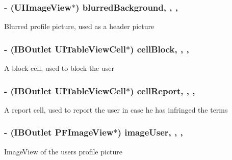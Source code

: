\subsubsection[{blurred\+Background}]{\setlength{\rightskip}{0pt plus 5cm}-\/ (U\+I\+Image\+View$\ast$) blurred\+Background\hspace{0.3cm}{\ttfamily [read]}, {\ttfamily [write]}, {\ttfamily [nonatomic]}, {\ttfamily [strong]}}\label{category_e_s_profile_view_07_08_ac1c297b924aa4ac3c198eced3b75208b}
Blurred profile picture, used as a header picture \hypertarget{category_e_s_profile_view_07_08_ace2fc34e56d6c51e12cc1b6307bb24da}{}
\subsubsection[{cell\+Block}]{\setlength{\rightskip}{0pt plus 5cm}-\/ (I\+B\+Outlet U\+I\+Table\+View\+Cell$\ast$) cell\+Block\hspace{0.3cm}{\ttfamily [read]}, {\ttfamily [write]}, {\ttfamily [nonatomic]}, {\ttfamily [strong]}}\label{category_e_s_profile_view_07_08_ace2fc34e56d6c51e12cc1b6307bb24da}
A block cell, used to block the user \hypertarget{category_e_s_profile_view_07_08_ae274c8f73382e3ff229eda693a2963d6}{}
\subsubsection[{cell\+Report}]{\setlength{\rightskip}{0pt plus 5cm}-\/ (I\+B\+Outlet U\+I\+Table\+View\+Cell$\ast$) cell\+Report\hspace{0.3cm}{\ttfamily [read]}, {\ttfamily [write]}, {\ttfamily [nonatomic]}, {\ttfamily [strong]}}\label{category_e_s_profile_view_07_08_ae274c8f73382e3ff229eda693a2963d6}
A report cell, used to report the user in case he has infringed the terms \hypertarget{category_e_s_profile_view_07_08_a3e56c07c9aeccde5e488e1df7fcfe5ab}{}
\subsubsection[{image\+User}]{\setlength{\rightskip}{0pt plus 5cm}-\/ (I\+B\+Outlet P\+F\+Image\+View$\ast$) image\+User\hspace{0.3cm}{\ttfamily [read]}, {\ttfamily [write]}, {\ttfamily [nonatomic]}, {\ttfamily [strong]}}\label{category_e_s_profile_view_07_08_a3e56c07c9aeccde5e488e1df7fcfe5ab}
Image\+View of the user\textquotesingle{}s profile picture \hypertarget{category_e_s_profile_view_07_08_a16688abf50759074dad3e4cff22a3bea}{}
